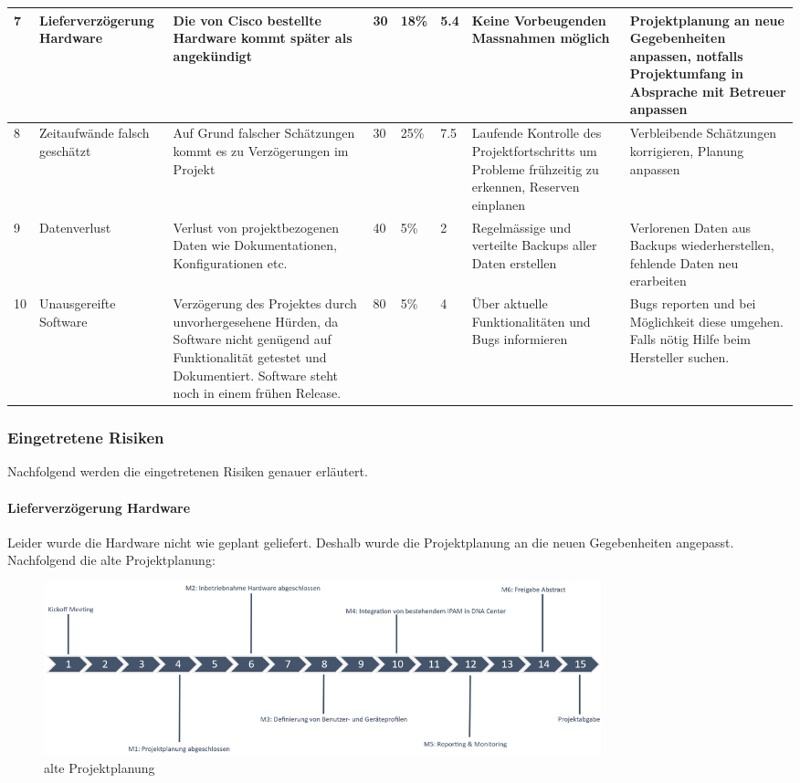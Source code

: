 \begin{landscape}
\begin{longtable}{|m{0.5cm}|m{3cm}|m{5cm}|m{0.75cm}|m{0.75cm}|m{0.75cm}|m{5cm}|m{5cm}|}
	\hline
	7 & Lieferverzögerung Hardware & Die von Cisco bestellte Hardware kommt später als angekündigt & 30 & 18\% & 5.4 & Keine Vorbeugenden Massnahmen möglich & Projektplanung an neue Gegebenheiten anpassen, notfalls Projektumfang in Absprache mit Betreuer anpassen \\
	\hline
	8 & Zeitaufwände falsch geschätzt & Auf Grund falscher Schätzungen kommt es zu Verzögerungen im Projekt & 30 & 25\% & 7.5 & Laufende Kontrolle des Projektfortschritts um Probleme frühzeitig zu erkennen, Reserven einplanen & Verbleibende Schätzungen korrigieren, Planung anpassen \\
	\hline
	9 & Datenverlust & Verlust von projektbezogenen Daten wie Dokumentationen, Konfigurationen etc. & 40 & 5\% & 2 & Regelmässige und verteilte Backups aller Daten erstellen & Verlorenen Daten aus Backups wiederherstellen, fehlende Daten neu erarbeiten \\
	\hline
	10 & Unausgereifte Software & Verzögerung des Projektes durch unvorhergesehene Hürden, da Software nicht genügend auf Funktionalität getestet und Dokumentiert. Software steht noch in einem frühen Release. & 80 & 5\% & 4 & Über aktuelle Funktionalitäten und Bugs informieren & Bugs reporten und bei Möglichkeit diese umgehen. Falls nötig Hilfe beim Hersteller suchen. \\
	\hline
\end{longtable}

\end{landscape}



\subsubsection{Eingetretene Risiken}
Nachfolgend werden die eingetretenen Risiken genauer erläutert.
\paragraph{Lieferverzögerung Hardware}
Leider wurde die Hardware nicht wie geplant geliefert. Deshalb wurde die Projektplanung an die neuen Gegebenheiten angepasst. \\
Nachfolgend die alte Projektplanung:
\begin{figure}[H]
	\centering
	\includegraphics[height=5cm]{img/ZeitlichePlanung_v1.png}
	\caption{alte Projektplanung}
	\label{fig:alte Projektplanung}
\end{figure} 


